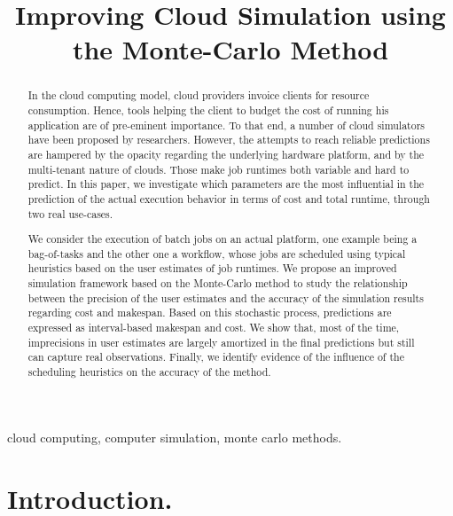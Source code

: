 \documentclass[10pt,conference,compsocconf]{IEEEtran}
\title{Improving Cloud Simulation using the Monte-Carlo Method}
\author{\IEEEauthorblockN{Luke~Bertot 
			and Stéphane~Genaud 
			and Julien~Gossa}
	\IEEEauthorblockA{Icube-ICPS --- UMR 7357, Univeristé de Strasbourg, CNRS\\
		P\^ole API Blvd S. Bant, 67400 Illkirch\\
		email: \url{lbertot@unistra.fr}, \url{genaud@unistra.fr}, \url{gossa@unistra.fr}}
	}
\begin{document}
\maketitle

\begin{abstract}
  In the  cloud computing  model, cloud providers  invoice clients  for resource
  consumption. Hence, tools helping the client to budget the cost of running his
  application are  of pre-eminent  importance. To  that end,  a number  of cloud
  simulators have been  proposed by researchers. However, the  attempts to reach
  reliable  predictions are  hampered by  the opacity  regarding the  underlying
  hardware platform, and by the  multi-tenant nature of clouds. Those make job
  runtimes both  variable and hard to  predict.  In this paper,  we investigate
  which parameters are the most  influential in the
  prediction of the actual execution behavior in terms of cost and total runtime,
  through two real  use-cases.

  We consider the execution  of batch jobs on an  actual platform, one example
  being a  bag-of-tasks and the other  one a workflow, whose  jobs are scheduled
  using typical  heuristics based on  the user  estimates of job  runtimes.  We
  propose an  improved simulation framework  based on the Monte-Carlo  method to
  study the  relationship between the  precision of  the user estimates  and the
  accuracy of the simulation results regarding  cost and makespan. Based on this
  stochastic process,  predictions are expressed as  interval-based makespan and
  cost.   We show  that, most  of the time, imprecisions  in  user estimates are
  largely amortized in the final predictions but still can capture real
  observations. Finally, we identify evidence of the influence of the scheduling 
  heuristics on the accuracy of the method.
\end{abstract}

\begin{IEEEkeywords}
cloud computing, computer simulation, monte carlo methods.
\end{IEEEkeywords}


\section{Introduction.}
\end{document}
